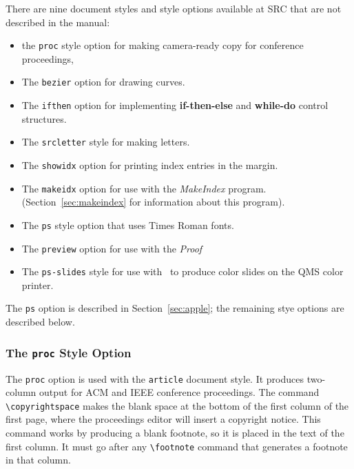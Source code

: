 There are nine document styles and style options available at SRC that
are not described in the manual: 
\begin{itemize}
\item the \mbox{\tt proc} style option for making camera-ready copy for
conference proceedings,

\item The {\tt bezier} option for drawing curves.

\item The {\tt ifthen} option for implementing {\bf if-then-else} and
{\bf while-do} control structures.

\item The \mbox{\tt srcletter} style for making letters.

\item The {\tt showidx} option for printing index entries in the
margin.  

\item The {\tt makeidx} option for use with the {\it MakeIndex\/}
program. (Section~\ref{sec:makeindex} for information about this
program).

\item The {\tt ps} style option that uses Times Roman fonts.  

\item The {\tt preview} option for use with the {\em Proof\/}

\item The {{\tt ps-slides}} style for use with \SLiTeX\ to produce
color slides on the QMS color printer.
\end{itemize} 
The {\tt ps} option is described in Section~\ref{sec:apple}; the
remaining stye options are described below.


\subsubsection{The {\tt proc} Style Option}

The {\tt proc} option is used with the \mbox{\tt article} document
style.  It produces two-column output for ACM and IEEE conference
proceedings.  The command \hbox{\verb|\copyrightspace|} makes the blank
space at the bottom of the first column of the first page, where the
proceedings editor will insert a copyright notice.  This command works
by producing a blank footnote, so it is placed in the text of the first
column.  It must go after any \hbox{\verb|\footnote|} command that
generates a footnote in that column.

